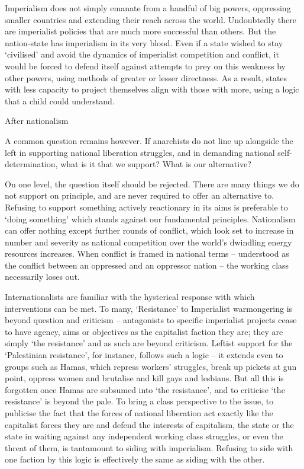 Imperialism does not simply emanate from a handful of big powers, oppressing smaller countries and extending their reach across the world. Undoubtedly there are imperialist policies that are much more successful than others. But the nation-state has imperialism in its very blood. Even if a state wished to stay ‘civilised’ and avoid the dynamics of imperialist competition and conflict, it would be forced to defend itself against attempts to prey on this weakness by other powers, using methods of greater or lesser directness. As a result, states with less capacity to project themselves align with those with more, using a logic that a child could understand.

After nationalism

A common question remains however. If anarchists do not line up alongside the left in supporting national liberation struggles, and in demanding national self-determination, what is it that we support? What is our alternative?

On one level, the question itself should be rejected. There are many things we do not support on principle, and are never required to offer an alternative to. Refusing to support something actively reactionary in its aims is preferable to ‘doing something’ which stands against our fundamental principles. Nationalism can offer nothing except further rounds of conflict, which look set to increase in number and severity as national competition over the world’s dwindling energy resources increases. When conflict is framed in national terms – understood as the conflict between an oppressed and an oppressor nation – the working class necessarily loses out.

Internationalists are familiar with the hysterical response with which interventions can be met. To many, ‘Resistance’ to Imperialist warmongering is beyond question and criticism – antagonists to specific imperialist projects cease to have agency, aims or objectives as the capitalist faction they are; they are simply ‘the resistance’ and as such are beyond criticism. Leftist support for the ‘Palestinian resistance’, for instance, follows such a logic – it extends even to groups such as Hamas, which repress workers’ struggles, break up pickets at gun point, oppress women and brutalise and kill gays and lesbians. But all this is forgotten once Hamas are subsumed into ‘the resistance’, and to criticise ‘the resistance’ is beyond the pale. To bring a class perspective to the issue, to publicise the fact that the forces of national liberation act exactly like the capitalist forces they are and defend the interests of capitalism, the state or the state in waiting against any independent working class struggles, or even the threat of them, is tantamount to siding with imperialism. Refusing to side with one faction by this logic is effectively the same as siding with the other.


